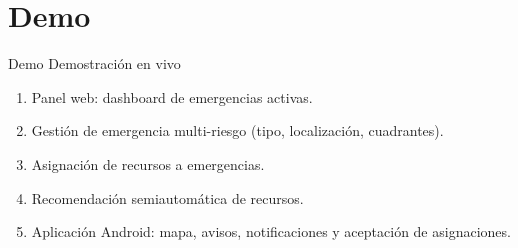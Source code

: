 \section{Demo}

\begin{frame}[c,shrink]{Demo}
    \centering
    \vspace{1cm}
    {\Large Demostración en vivo}
            \begin{enumerate}
            \item Panel web: dashboard de emergencias activas.
            \item Gestión de emergencia multi-riesgo (tipo, localización, cuadrantes).
            \item Asignación de recursos a emergencias.
            \item Recomendación semiautomática de recursos.
            \item Aplicación Android: mapa, avisos, notificaciones y aceptación de asignaciones.
        \end{enumerate}
\end{frame}
